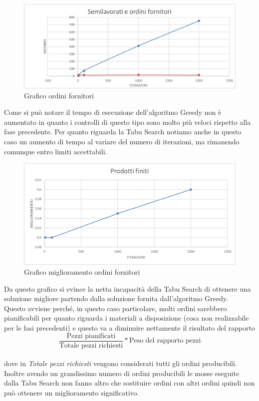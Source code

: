 \begin{figure}[H]
	\includegraphics[width=13cm]{immagini/graficofo2.png}
	\centering
	\caption{Grafico ordini fornitori}
\end{figure}

Come si può notare il tempo di esecuzione dell'algoritmo Greedy non è aumentato in quanto i controlli di questo tipo sono molto più veloci rispetto alla fase precedente.
Per quanto riguarda la Tabu Search notiamo anche in questo caso un aumento di tempo al variare del numero di iterazioni, ma rimanendo comunque entro limiti accettabili.

\begin{figure}[H]
	\includegraphics[width=13cm]{immagini/graficofo3.png}
	\centering
	\caption{Grafico miglioramento ordini fornitori}
\end{figure}

Da questo grafico si evince la netta incapacità della Tabu Search di ottenere una soluzione migliore partendo dalla soluzione fornita dall'algoritmo Greedy.\\
Questo avviene perché, in questo caso particolare, molti ordini sarebbero pianificabili per quanto riguarda i materiali a disposizione (cosa non realizzabile per le fasi
precedenti) e questo va a diminuire nettamente il risultato del rapporto \[\frac{\text{Pezzi pianificati}}{\text{Totale pezzi richiesti}} * \text{Peso del rapporto pezzi}\]\\
dove in \textit{Totale pezzi richiesti} vengono considerati tutti gli ordini producibili.\\ Inoltre avendo un grandissimo numero di ordini producibili le mosse eseguite 
dalla Tabu Search non fanno altro che sostituire ordini con altri ordini quindi non può ottenere un miglioramento significativo.

